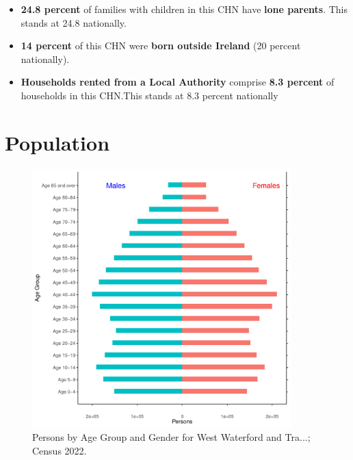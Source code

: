 \documentclass{article}
\begin{document}
\begin{itemize}
\item \textbf{24.8 percent} of families with children in this CHN have \textbf{lone parents}. This stands at 24.8 nationally.

\item \textbf{14 percent} of this CHN were \textbf{born outside Ireland} (20 percent nationally).

\item \textbf{Households rented from a Local Authority} comprise \textbf{8.3 percent} of households in this CHN.This stands at 8.3 percent nationally

\end{itemize}

\pagebreak

\section{Population} 
\label{sect:Pop}

\begin{figure}[h]
	\centering
	\includegraphics[width = 100mm]{../figures/PyramidPlot.pdf}
	\caption{Persons by Age Group and Gender for West Waterford and Tra...; Census 2022.}
	\label{fig:2ae19629-1a6a-13a3-e055-000000000001}
	\end{figure}
\end{document}
